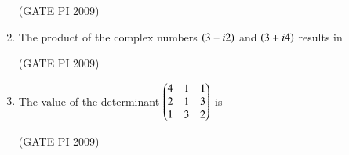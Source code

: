 \documentclass[journal,12pt,onecolumn]{IEEEtran}
\theoremstyle{remark}
\begin{document}
\begin{enumerate}
\begin{enumerate}
\end{enumerate}
\hfill (GATE PI 2009)
\item The product of the complex numbers $\left(3 - i2\right)$ and $\left(3 + i4\right)$ results in
\begin{enumerate}
\end{enumerate}
\hfill (GATE PI 2009)
\item The value of the determinant
$
\begin{pmatrix}
4 & 1 & 1 \\
2 & 1 & 3 \\
1 & 3 & 2
\end{pmatrix}
$
is
\begin{enumerate}
\end{enumerate}

\hfill (GATE PI 2009)


\end{enumerate}
\end{document}
